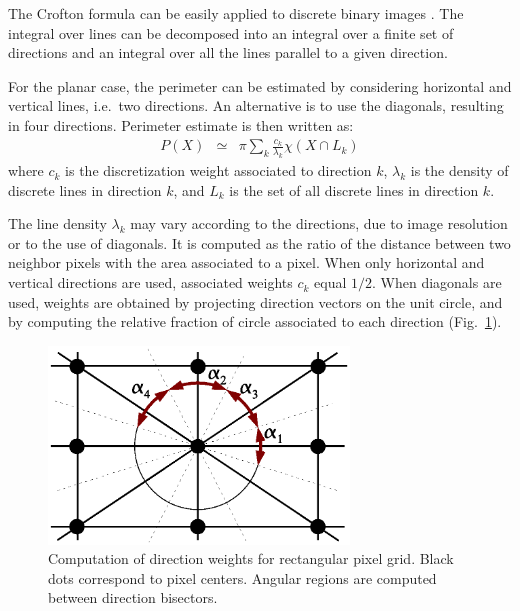 \documentclass{InsightArticle}
\begin{document}
The Crofton formula can be easily applied to discrete binary images \cite{Lang2001, Legland2007}. 
The integral over lines can be decomposed into an integral over a finite set of directions
and an integral over all the lines parallel to a given direction. 

For the planar case, the perimeter can be estimated by considering horizontal and vertical lines, 
i.e.\ two directions. An alternative is to use the diagonals, resulting in four directions. 
Perimeter estimate is then written as:
\begin{eqnarray}
P(X) & \simeq & \pi \sum_{k}\frac{c_{k}}{\lambda_{k}}\chi \left( X \cap L_{k} \right)
\end{eqnarray}
where $c_k$ is the discretization weight associated to direction $k$, 
$\lambda_k$ is the density of discrete lines in direction $k$, 
and $L_k$ is the set of all discrete lines in direction $k$.

The line density $\lambda_k$ may vary according to the directions, 
due to image resolution or to the use of diagonals. 
It is computed as the ratio of the distance between two neighbor pixels with
the area associated to a pixel.
When only horizontal and vertical directions are used, associated weights $c_k$ equal $1/2$.
When diagonals are used, weights are obtained by projecting direction vectors on the unit circle, 
and by computing the relative fraction of circle associated to each direction 
(Fig.~\ref{fig:DirectionWeights2D3D}).

\begin{figure}[!htb]
\begin{center}
\includegraphics[width=8cm]{images/directionsWeights2D}
\end{center}
\caption{Computation of direction weights for rectangular pixel grid. 
Black dots correspond to pixel centers. 
Angular regions are computed between direction bisectors.}
\label{fig:DirectionWeights2D3D}
\end{figure}
\end{document}
